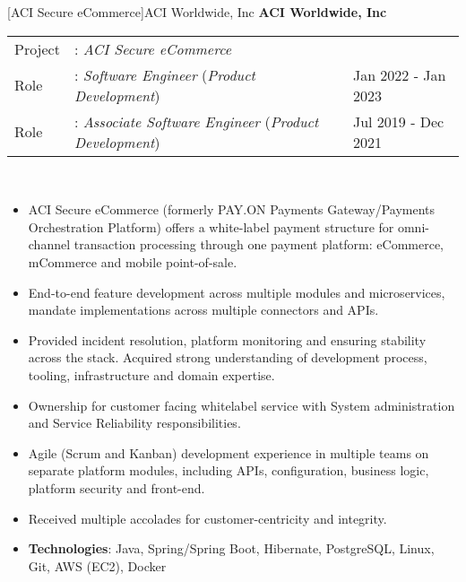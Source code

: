 \documentclass[a4paper]{article}
\begin{document}
[ACI Secure eCommerce]{ACI Worldwide, Inc}
\textbf{ACI Worldwide, Inc} \\
\noindent
\begin{tabularx}{\textwidth}{ l l>{\raggedleft\arraybackslash}X}
	Project & : \textit{ACI Secure eCommerce}                                       &                     \\
	Role    & : \textit{Software Engineer} (\textit{Product Development})           & Jan 2022 - Jan 2023 \\
	Role    & : \textit{Associate Software Engineer} (\textit{Product Development}) & Jul 2019 - Dec 2021 \\
\end{tabularx}
\textbf{} \\
\begin{itemize} \itemsep 1pt
	\item ACI Secure eCommerce (formerly PAY.ON Payments Gateway/Payments Orchestration Platform) offers a white-label payment structure for omni-channel transaction processing through one payment platform: eCommerce, mCommerce and mobile point-of-sale.
	\item End-to-end feature development across multiple modules and microservices, mandate implementations across multiple connectors and APIs.
	\item Provided incident resolution, platform monitoring and ensuring stability across the stack. Acquired strong understanding of development process, tooling, infrastructure and domain expertise.
	\item Ownership for customer facing whitelabel service with System administration and Service Reliability responsibilities.
	\item Agile (Scrum and Kanban) development experience in multiple teams on separate platform modules, including APIs, configuration, business logic, platform security and front-end.
	\item Received multiple accolades for customer-centricity and integrity.
	\item \textbf{Technologies}: Java, Spring/Spring Boot, Hibernate, PostgreSQL, Linux, Git, AWS (EC2), Docker
\end{itemize}

\end{document}
